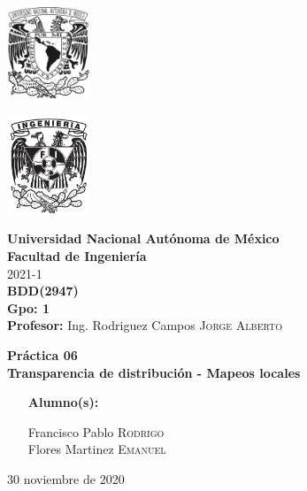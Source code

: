 \documentclass{article}
\newcommand{\materia}{BDD}
\newcommand{\clave}{2947}
\newcommand{\profesor}{Ing. Rodriguez Campos \textsc{Jorge Alberto}}
\newcommand{\semestre}{2021-1}
\newcommand{\alumno}{
    Francisco Pablo \textsc{Rodrigo}  \\ 
    Flores Martinez \textsc{Emanuel}   
}
\newcommand{\actividad}{Práctica 06}
\newcommand{\titulo}{Transparencia de distribución - Mapeos locales}
\newcommand{\fechaEntrega}{30 noviembre de 2020}
\begin{document}
\thispagestyle{empty}
\begin{minipage}[t][5cm][t]{0.2\linewidth}
    \includegraphics[width=2.5cm]{unam.jpg}
    \vspace{10cm}

    \includegraphics[width=2.5cm]{fiblack}
\end{minipage}
\begin{minipage}[t]{0.7\linewidth}
    \vspace{-2.5cm}
    \LARGE{\textbf{Universidad Nacional Autónoma de México}}\\
    \Large{\textbf{Facultad de Ingeniería}} \\

    \large{\semestre}\\[2cm]

    \large{\textbf{\materia (\clave)}}\\
    \large{\textbf{Gpo: 1}}\\[5mm]
    \large{\textbf{Profesor:} \profesor}\\ [1.5cm]
    \begin{center}
        \LARGE{\textbf{\actividad}}\\
        \LARGE{\textbf{\titulo}}\\
    \end{center}

    \vspace{3.3cm}

    \large{
        \begin{itemize}[
            noitemsep,
            align=left,
        ]
            \item [\textbf{Alumno(s):}] 
            \begin{flushright}
                \alumno
            \end{flushright}
        \end{itemize}
    } \vspace{1.5cm}

    \begin{flushright}
        \fechaEntrega%
    \end{flushright}
\end{minipage}
\end{document}
